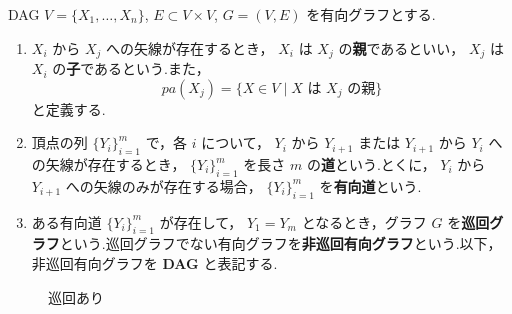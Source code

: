 \documentclass[uplatex, dvipdfmx]{jsarticle}
\begin{document}
\begin{defn}{DAG}
$V = \{X_1, \dots, X_n\}$, $E \subset V \times V$, $G = (V, E)$ を有向グラフとする.
  \begin{enumerate}
      \item $X_i$ から $X_j$ への矢線が存在するとき， $X_i$ は $X_j$ の\textbf{親}であるといい， $X_j$ は $X_i$ の\textbf{子}であるという.また，
      \begin{equation}
          pa(X_j) = \{ X \in V \mid X \text{ は } X_j \text{ の親} \}
      \end{equation}
      と定義する.
      \item 頂点の列 $\{Y_i\}_{i=1}^m$ で，各 $i$ について， $Y_i$ から $Y_{i+1}$ または $Y_{i+1}$ から $Y_i$ への矢線が存在するとき， $\{Y_i\}_{i=1}^m$ を長さ $m$ の\textbf{道}という.とくに， $Y_i$ から $Y_{i+1}$ への矢線のみが存在する場合， $\{Y_i\}_{i=1}^m$ を\textbf{有向道}という.
      \item ある有向道 $\{Y_i\}_{i=1}^m$ が存在して， $Y_1 = Y_m$ となるとき，グラフ $G$ を\textbf{巡回グラフ}という.巡回グラフでない有向グラフを\textbf{非巡回有向グラフ}という.以下，非巡回有向グラフを \textbf{DAG} と表記する.
  \end{enumerate}
\end{defn}

\begin{figure}[H]
  \begin{minipage}{0.45\textwidth}
      \centering
      \caption{巡回なし}
  \end{minipage}
  \begin{minipage}{0.45\textwidth}
      \centering
      \caption{巡回あり}
  \end{minipage}
\end{figure}
\end{document}

